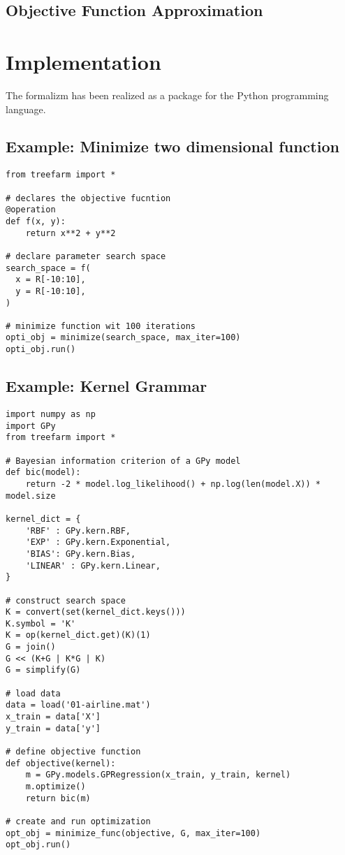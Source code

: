 \documentclass[english]{article}
\begin{document}
\subsection{Objective Function Approximation}


\section{Implementation}
The formalizm has been realized as a package for the Python programming language.

\subsection{Example: Minimize two dimensional function}

\begin{verbatim}
from treefarm import *

# declares the objective fucntion
@operation
def f(x, y):
    return x**2 + y**2

# declare parameter search space
search_space = f(
  x = R[-10:10],
  y = R[-10:10],
)

# minimize function wit 100 iterations
opti_obj = minimize(search_space, max_iter=100)
opti_obj.run()

\end{verbatim}

\subsection{Example: Kernel Grammar}

\begin{verbatim}
import numpy as np
import GPy
from treefarm import *

# Bayesian information criterion of a GPy model
def bic(model):
    return -2 * model.log_likelihood() + np.log(len(model.X)) * model.size

kernel_dict = {
    'RBF' : GPy.kern.RBF,
    'EXP' : GPy.kern.Exponential,
    'BIAS': GPy.kern.Bias,
    'LINEAR' : GPy.kern.Linear,
}

# construct search space
K = convert(set(kernel_dict.keys()))
K.symbol = 'K'
K = op(kernel_dict.get)(K)(1)
G = join()
G << (K+G | K*G | K)
G = simplify(G)

# load data
data = load('01-airline.mat')
x_train = data['X']
y_train = data['y']

# define objective function
def objective(kernel):
    m = GPy.models.GPRegression(x_train, y_train, kernel)
    m.optimize()
    return bic(m)

# create and run optimization
opt_obj = minimize_func(objective, G, max_iter=100)
opt_obj.run()

\end{verbatim}
\end{document}
